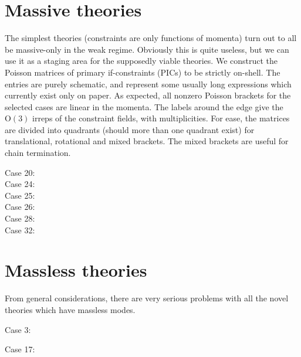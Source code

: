 \documentclass[aps,prd,reprint,preprintnumbers,superscriptaddress,showpacs,floatfix]{revtex4-2}
\begin{document}
\section{Massive theories}

The simplest theories (constraints are only functions of momenta) turn out to all be massive-only in the weak regime. Obviously this is quite useless, but we can use it as a staging area for the supposedly viable theories. We construct the Poisson matrices of primary if-constraints (PICs) to be strictly on-shell. The entries are purely schematic, and represent some usually long expressions which currently exist only on paper. As expected, all nonzero Poisson brackets for the selected cases are linear in the momenta. The labels around the edge give the $\mathrm{O}(3)$ irreps of the constraint fields, with multiplicities. For ease, the matrices are divided into quadrants (should more than one quadrant exist) for translational, rotational and mixed brackets. The mixed brackets are useful for chain termination.

Case 20:
\begin{equation}
  
  \label{<+label+>}
\end{equation}
Case 24:
\begin{equation}
  
  \label{<+label+>}
\end{equation}
Case 25:
\begin{equation}
  
  \label{<+label+>}
\end{equation}
Case 26:
\begin{equation}
  
  \label{<+label+>}
\end{equation}
Case 28:
\begin{equation}
  
  \label{<+label+>}
\end{equation}
Case 32:
\begin{equation}
  
  \label{<+label+>}
\end{equation}

\section{Massless theories}

From general considerations, there are very serious problems with all the novel theories which have massless modes.

Case 3:
\begin{equation}
  
  \label{<+label+>}
\end{equation}

Case 17:
\begin{equation}
  
  \label{<+label+>}
\end{equation}

\begin{acknowledgments}


\end{acknowledgments}



\end{document}

